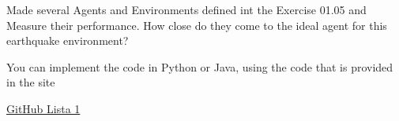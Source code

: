\documentclass[11pt]{article}
\newenvironment{EX}[2][Exercise]{\begin{trivlist}
\item[{\color{red} \hskip \labelsep {\bfseries #1}\hskip \labelsep {\bfseries #2.}}]}{\end{trivlist}}
\newenvironment{SL}[1][Solution]{\begin{trivlist}
\item[{\color{blue} \hskip \labelsep {\bfseries #1:}}]}{\end{trivlist}}
\begin{document}
\begin{EX}{01.06}

Made several Agents and Environments defined int the Exercise 01.05 and Measure their performance. How close do they come to the ideal agent for this earthquake environment?
\end{EX}

You can implement the code in Python or Java, using the code that is provided in the site

\href{https://github.com/juliosibaja/IA2016.2/tree/master/lista1/}{GitHub Lista 1}

\end{document}
